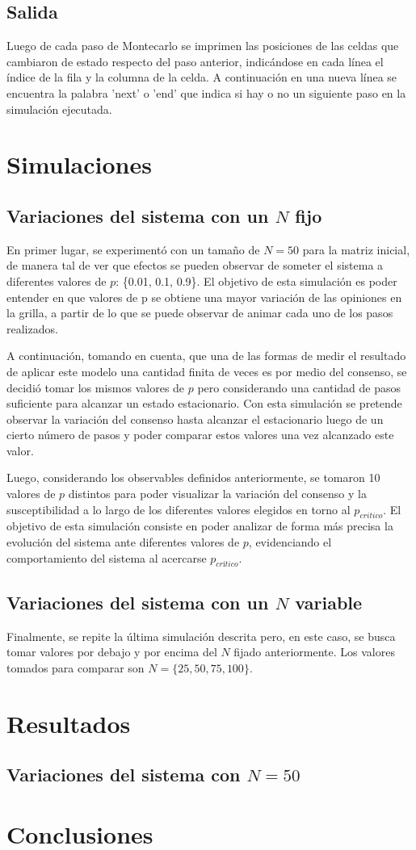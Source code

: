 \documentclass[12pt]{article}
\begin{document}
\subsection{Salida}
Luego de cada paso de Montecarlo se imprimen las posiciones de las celdas que cambiaron de estado respecto del paso anterior, indicándose en cada línea el índice de la fila y la columna de la celda. A continuación en una nueva línea se encuentra la palabra 'next' o 'end' que indica si hay o no un siguiente paso en la simulación ejecutada.

\section{Simulaciones}
\subsection{Variaciones del sistema con un $N$ fijo}
En primer lugar, se experimentó con un tamaño de $N = 50$ para la matriz inicial, de manera tal de ver que efectos se pueden observar de someter el sistema a diferentes valores de $p$: \{0.01, 0.1, 0.9\}. El objetivo de esta simulación es poder entender en que valores de p se obtiene una mayor variación de las opiniones en la grilla, a partir de lo que se puede observar de animar cada uno de los pasos realizados.

A continuación, tomando en cuenta, que una de las formas de medir el resultado de aplicar este modelo una cantidad finita de veces es por medio del consenso, se decidió tomar los mismos valores de $p$ pero considerando una cantidad de pasos suficiente para alcanzar un estado estacionario. Con esta simulación se pretende observar la variación del consenso hasta alcanzar el estacionario luego de un cierto número de pasos y poder comparar estos valores una vez alcanzado este valor. 

Luego, considerando los observables definidos anteriormente, se tomaron 10 valores de $p$ distintos para poder visualizar la variación del consenso y la susceptibilidad a lo largo de los diferentes valores elegidos en torno al $p_{critico}$. El objetivo de esta simulación consiste en poder analizar de forma más precisa la evolución del sistema ante diferentes valores de $p$, evidenciando el comportamiento del sistema al acercarse $p_{crítico}$.

\subsection{Variaciones del sistema con un $N$ variable}
Finalmente, se repite la última simulación descrita pero, en este caso, se busca tomar valores por debajo y por encima del $N$ fijado anteriormente. Los valores tomados para comparar son $N = \{25,50,75,100\}$. 
 
\section{Resultados}
\subsection{Variaciones del sistema con $N = 50$}

\section{Conclusiones}
\end{document}
